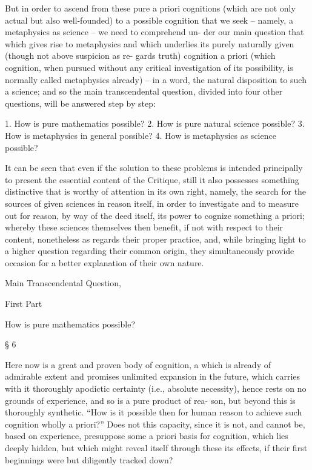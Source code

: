 But in order to ascend from these pure a priori cognitions (which are
not only actual but also well-founded) to a possible cognition that we
seek – namely, a metaphysics as science – we need to comprehend un-
der our main question that which gives rise to metaphysics and which
underlies its purely naturally given (though not above suspicion as re-
gards truth) cognition a priori (which cognition, when pursued without
any critical investigation of its possibility, is normally called metaphysics
already) – in a word, the natural disposition to such a science; and so the
main transcendental question, divided into four other questions, will be
answered step by step:

1. How is pure mathematics possible?
2. How is pure natural science possible?
3. How is metaphysics in general possible?
4. How is metaphysics as science possible?

It can be seen that even if the solution to these problems is intended
principally to present the essential content of the Critique, still it also
possesses something distinctive that is worthy of attention in its own
right, namely, the search for the sources of given sciences in reason itself,
in order to investigate and to measure out for reason, by way of the deed
itself, its power to cognize something a priori; whereby these sciences
themselves then beneﬁt, if not with respect to their content, nonetheless
as regards their proper practice, and, while bringing light to a higher
question regarding their common origin, they simultaneously provide
occasion for a better explanation of their own nature.

Main Transcendental Question,

First Part

How is pure mathematics possible?

§ 6

Here now is a great and proven body of cognition, a which is already of
admirable extent and promises unlimited expansion in the future, which
carries with it thoroughly apodictic certainty (i.e., absolute necessity),
hence rests on no grounds of experience, and so is a pure product of rea-
son, but beyond this is thoroughly synthetic. “How is it possible then for
human reason to achieve such cognition wholly a priori?” Does not this
capacity, since it is not, and cannot be, based on experience, presuppose
some a priori basis for cognition, which lies deeply hidden, but which
might reveal itself through these its effects, if their ﬁrst beginnings were
but diligently tracked down?

